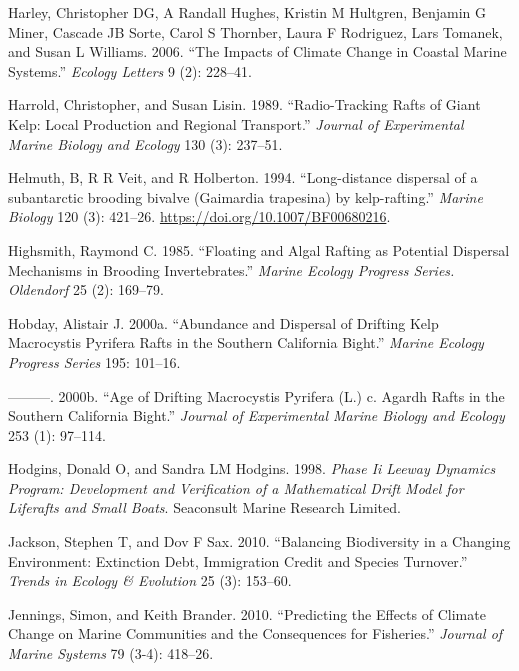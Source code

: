 \documentclass[
]{article}
\begin{document}
\leavevmode\hypertarget{ref-Harley2006}{}%
Harley, Christopher DG, A Randall Hughes, Kristin M Hultgren, Benjamin G
Miner, Cascade JB Sorte, Carol S Thornber, Laura F Rodriguez, Lars
Tomanek, and Susan L Williams. 2006. ``The Impacts of Climate Change in
Coastal Marine Systems.'' \emph{Ecology Letters} 9 (2): 228--41.

\leavevmode\hypertarget{ref-harrold1989}{}%
Harrold, Christopher, and Susan Lisin. 1989. ``Radio-Tracking Rafts of
Giant Kelp: Local Production and Regional Transport.'' \emph{Journal of
Experimental Marine Biology and Ecology} 130 (3): 237--51.

\leavevmode\hypertarget{ref-helmuth1994}{}%
Helmuth, B, R R Veit, and R Holberton. 1994. ``Long-distance dispersal
of a subantarctic brooding bivalve (Gaimardia trapesina) by
kelp-rafting.'' \emph{Marine Biology} 120 (3): 421--26.
\url{https://doi.org/10.1007/BF00680216}.

\leavevmode\hypertarget{ref-highsmith1985}{}%
Highsmith, Raymond C. 1985. ``Floating and Algal Rafting as Potential
Dispersal Mechanisms in Brooding Invertebrates.'' \emph{Marine Ecology
Progress Series. Oldendorf} 25 (2): 169--79.

\leavevmode\hypertarget{ref-hobday2000a}{}%
Hobday, Alistair J. 2000a. ``Abundance and Dispersal of Drifting Kelp
Macrocystis Pyrifera Rafts in the Southern California Bight.''
\emph{Marine Ecology Progress Series} 195: 101--16.

\leavevmode\hypertarget{ref-hobday2000b}{}%
---------. 2000b. ``Age of Drifting Macrocystis Pyrifera (L.) c. Agardh
Rafts in the Southern California Bight.'' \emph{Journal of Experimental
Marine Biology and Ecology} 253 (1): 97--114.

\leavevmode\hypertarget{ref-hodgins1998}{}%
Hodgins, Donald O, and Sandra LM Hodgins. 1998. \emph{Phase Ii Leeway
Dynamics Program: Development and Verification of a Mathematical Drift
Model for Liferafts and Small Boats}. Seaconsult Marine Research
Limited.

\leavevmode\hypertarget{ref-jackson2010}{}%
Jackson, Stephen T, and Dov F Sax. 2010. ``Balancing Biodiversity in a
Changing Environment: Extinction Debt, Immigration Credit and Species
Turnover.'' \emph{Trends in Ecology \& Evolution} 25 (3): 153--60.

\leavevmode\hypertarget{ref-Jennings2010}{}%
Jennings, Simon, and Keith Brander. 2010. ``Predicting the Effects of
Climate Change on Marine Communities and the Consequences for
Fisheries.'' \emph{Journal of Marine Systems} 79 (3-4): 418--26.
\end{document}
